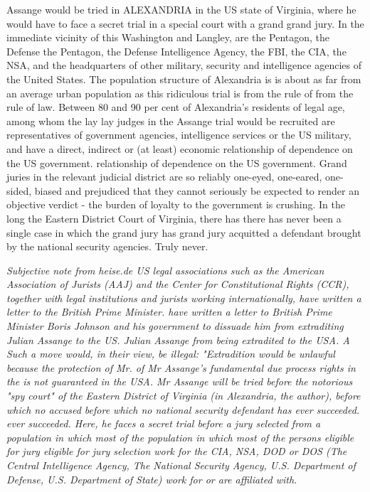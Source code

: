 \begin{multicols}{2}
Assange would be tried in ALEXANDRIA in the US state of Virginia, where he would have to face a secret trial in a special court with a grand
grand jury. In the immediate vicinity of this
Washington and Langley, are the Pentagon, the Defense
the Pentagon, the Defense Intelligence Agency, the FBI, the
CIA, the NSA, and the headquarters of other military,
security and intelligence agencies of the United States.
The population structure of Alexandria is
is about as far from an average urban population
as this ridiculous trial is from the rule of
from the rule of law. Between 80 and 90 per cent
of Alexandria's residents of legal age, among whom the lay
lay judges in the Assange trial would be recruited are representatives of government agencies, intelligence services or the US military, and have a direct, indirect or (at least) economic relationship of dependence on the US government.
relationship of dependence on the US government. Grand juries
in the relevant judicial district are so reliably one-eyed, one-eared, one-sided, biased and prejudiced that they cannot seriously be expected to render an objective verdict - the burden of loyalty
to the government is crushing. In the long
the Eastern District Court of Virginia, there has
there has never been a single case in which the grand jury has
grand jury acquitted a defendant brought by the national security agencies. Truly never.

\textit{Subjective note from heise.de
US legal associations such as the American Association of Jurists (AAJ) and the Center for Constitutional Rights (CCR), together with legal institutions and jurists working internationally, have written a letter to the British Prime Minister.
have written a letter to British Prime Minister Boris Johnson and his government to dissuade him from extraditing Julian Assange to the US.
Julian Assange from being extradited to the USA. A
Such a move would, in their view, be illegal:
"Extradition would be unlawful because the protection of Mr.
of Mr Assange's fundamental due process rights in the
is not guaranteed in the USA. Mr Assange will be tried before the
notorious "spy court" of the Eastern District of
Virginia (in Alexandria, the author), before which no accused
before which no national security defendant has ever succeeded.
ever succeeded. Here, he faces a secret trial before a jury selected from a population in which most of the
population in which most of the persons eligible for jury
eligible for jury selection work for the CIA, NSA,
DOD or DOS (The Central Intelligence Agency, The National Security Agency, U.S. Department of Defense, U.S.
Department of State) work for or are affiliated with.
}



\end{multicols}
